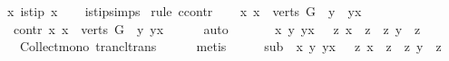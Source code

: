 \begin{isabellebody}
{\isachardoublequoteopen}{\isasymexists}x{\isachardot}{\kern0pt}\ is{\isacharunderscore}{\kern0pt}tip\ x{\isachardoublequoteclose}\isanewline
%
\isadelimproof
\ \ %
\endisadelimproof
%
\isatagproof
{}\isamarkupfalse%
\ is{\isacharunderscore}{\kern0pt}tip{\isachardot}{\kern0pt}simps\isanewline
{}\isamarkupfalse%
\ {\isacharparenleft}{\kern0pt}rule\ ccontr{\isacharparenright}{\kern0pt}\isanewline
\ \ \isamarkupfalse%
\ {\isachardoublequoteopen}{\isasymnexists}x{\isachardot}{\kern0pt}\ x\ {\isasymin}\ verts\ G\ {\isasymand}\ {\isacharparenleft}{\kern0pt}{\isasymforall}y{\isachardot}{\kern0pt}\ {\isasymnot}\ y{\isasymrightarrow}\isactrlsup {\isacharplus}{\kern0pt}x{\isacharparenright}{\kern0pt}{\isachardoublequoteclose}\isanewline
\ \ \isamarkupfalse%
\ \isamarkupfalse%
\ contr{\isacharcolon}{\kern0pt}\ {\isachardoublequoteopen}{\isasymforall}x{\isachardot}{\kern0pt}\ x\ {\isasymin}\ verts\ G\ {\isasymlongrightarrow}\ {\isacharparenleft}{\kern0pt}{\isasymexists}y{\isachardot}{\kern0pt}\ y{\isasymrightarrow}\isactrlsup {\isacharplus}{\kern0pt}x{\isacharparenright}{\kern0pt}{\isachardoublequoteclose}\isanewline
\ \ \ \ \isamarkupfalse%
\ auto\ \ \isanewline
\ \ \isamarkupfalse%
\ {\isachardoublequoteopen}{\isasymforall}\ x\ y{\isachardot}{\kern0pt}\ y{\isasymrightarrow}\isactrlsup {\isacharplus}{\kern0pt}x\ {\isasymlongrightarrow}\ \ {\isacharbraceleft}{\kern0pt}z{\isachardot}{\kern0pt}\ x\ {\isasymrightarrow}\isactrlsup {\isacharplus}{\kern0pt}\ z{\isacharbraceright}{\kern0pt}\ {\isasymsubseteq}\ {\isacharbraceleft}{\kern0pt}z{\isachardot}{\kern0pt}\ y\ {\isasymrightarrow}\isactrlsup {\isacharplus}{\kern0pt}\ z{\isacharbraceright}{\kern0pt}{\isachardoublequoteclose}\isanewline
\ \ \ \ \isamarkupfalse%
\ \ Collect{\isacharunderscore}{\kern0pt}mono\ trancl{\isacharunderscore}{\kern0pt}trans\isanewline
\ \ \ \ \isamarkupfalse%
\ metis\isanewline
\ \ \isamarkupfalse%
\ \isamarkupfalse%
\ sub{\isacharcolon}{\kern0pt}\ {\isachardoublequoteopen}{\isasymforall}\ x\ y{\isachardot}{\kern0pt}\ y{\isasymrightarrow}\isactrlsup {\isacharplus}{\kern0pt}x\ {\isasymlongrightarrow}\ \ {\isacharbraceleft}{\kern0pt}z{\isachardot}{\kern0pt}\ x\ {\isasymrightarrow}\isactrlsup {\isacharplus}{\kern0pt}\ z{\isacharbraceright}{\kern0pt}\ {\isasymsubset}\ {\isacharbraceleft}{\kern0pt}z{\isachardot}{\kern0pt}\ y\ {\isasymrightarrow}\isactrlsup {\isacharplus}{\kern0pt}\ z{\isacharbraceright}{\kern0pt}{\isachardoublequoteclose}\isanewline

\end{isabellebody}
